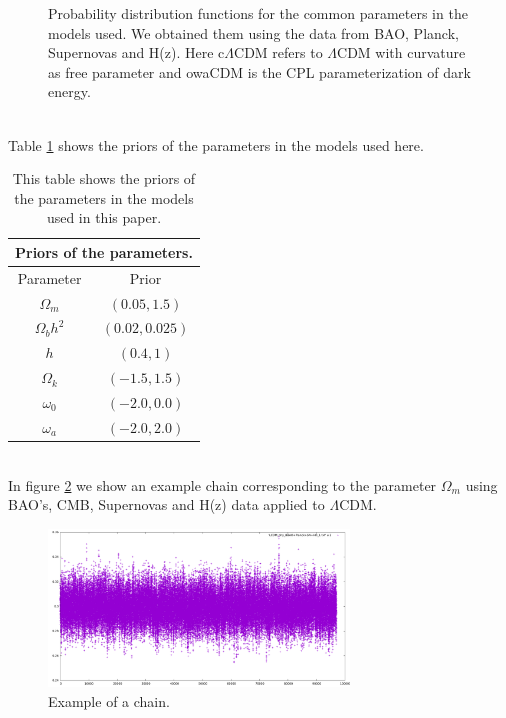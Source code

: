 \documentclass[onecolumn,           %
               showpacs,            %
               preprintnumbers,     %
               aps,                 %
               letterpaper,             %
               superscriptaddress,      %
               nofootinbib,         %
               tightenlines,        %
               floats,floatfix      %
               ,usenatbib,
               ]{revtex4-1}
\begin{document}
\begin{figure}[htp]
	\caption{Probability distribution functions for the common parameters in the models used. We obtained them using the data from BAO, Planck, Supernovas and H(z). Here c$\Lambda$CDM refers to $\Lambda$CDM with curvature as free parameter and owaCDM is the CPL parameterization of dark energy.}
	\label{bestfit}
\end{figure}\\
Table \ref{tablapriors} shows the priors of the parameters in the models used here.
\begin{table} [htbp]
	\begin{center}
		\begin{tabular}{|c|c|}
			\multicolumn{2}{c}{\textbf{Priors of the parameters.}}\\
			\hline
			Parameter & Prior \\
			\hline
			$\Omega_m$ & $\left(0.05, 1.5\right)$  \\
			\hline
			$\Omega_b h^2$ & $\left(0.02, 0.025\right)$ \\
			\hline
			$h$ & $\left(0.4, 1\right)$ \\
			\hline
			$\Omega_k$ & $\left(-1.5, 1.5\right)$ \\
			\hline
			$\omega_0$ & $\left(-2.0, 0.0\right)$ \\
			\hline
			$\omega_a$ & $\left(-2.0, 2.0\right)$\\
			\hline
		\end{tabular}
		\caption{This table shows the priors of the parameters in the models used in this paper.}
		\label{tablapriors}
	\end{center}
\end{table} \\
In figure \ref{examplechain} we show an example chain corresponding to the parameter $\Omega_m$ using BAO's, CMB, Supernovas and H(z) data applied to $\Lambda$CDM.
\begin{figure}[htp]
	\centering
	\includegraphics[width=8cm]{FiguresCosmo/chain_cosmo.pdf}	
	\caption{Example of a chain.}
	\label{examplechain}
\end{figure}
\end{document}
